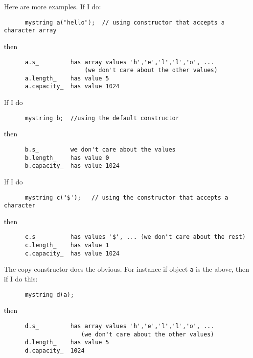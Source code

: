 Here are more examples. If I do:
{\small
\begin{Verbatim}
      mystring a("hello");  // using constructor that accepts a character array
\end{Verbatim}
}
then
{\small
\begin{Verbatim}
      a.s_         has array values 'h','e','l','l','o', ...
                       (we don't care about the other values)
      a.length_    has value 5
      a.capacity_  has value 1024
\end{Verbatim}
}
If I do
{\small
\begin{Verbatim}
      mystring b;  //using the default constructor
\end{Verbatim}
}
then
{\small
\begin{Verbatim}
      b.s_         we don't care about the values
      b.length_    has value 0
      b.capacity_  has value 1024
\end{Verbatim}
}
If I do
{\small
\begin{Verbatim}
      mystring c('$');   // using the constructor that accepts a character
\end{Verbatim}
}
then
{\small
\begin{Verbatim}
      c.s_         has values '$', ... (we don't care about the rest)
      c.length_    has value 1
      c.capacity_  has value 1024
\end{Verbatim}
}

The copy constructor does the obvious. For instance if object \verb!a!
is the above, then if I do this:
{\small
\begin{Verbatim}
      mystring d(a);
\end{Verbatim}
}
then
{\small
\begin{Verbatim}
      d.s_         has array values 'h','e','l','l','o', ... 
                      (we don't care about the other values)
      d.length_    has value 5
      d.capacity_  1024
\end{Verbatim}
}
